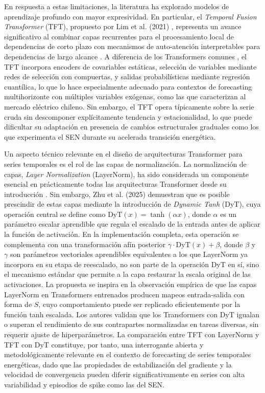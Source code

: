 En respuesta a estas limitaciones, la literatura ha explorado modelos de aprendizaje profundo con mayor expresividad. En particular, el \textit{Temporal Fusion Transformer} (TFT), propuesto por Lim et al. (2021) \cite{TFT}, representa un avance significativo al combinar capas recurrentes para el procesamiento local de dependencias de corto plazo con mecanismos de auto-atención interpretables para dependencias de largo alcance \cite{TFT}. A diferencia de los Transformers comunes \cite{Vaswani2017Attention}, el TFT incorpora encoders de covariables estáticas, selección de variables mediante redes de selección con compuertas, y salidas probabilísticas mediante regresión cuantílica, lo que lo hace especialmente adecuado para contextos de forecasting multihorizonte con múltiples variables exógenas, como las que caracterizan al mercado eléctrico chileno. Sin embargo, el TFT opera típicamente sobre la serie cruda sin descomponer explícitamente tendencia y estacionalidad, lo que puede dificultar su adaptación en presencia de cambios estructurales graduales como los que experimenta el SEN durante su acelerada transición energética.

Un aspecto técnico relevante en el diseño de arquitecturas Transformer para series temporales es el rol de las capas de normalización. La normalización de capas, \textit{Layer Normalization} (LayerNorm), ha sido considerada un componente esencial en prácticamente todas las arquitecturas Transformer desde su introducción \cite{Vaswani2017Attention}. Sin embargo, Zhu et al. (2025) \cite{Zhu2025Transformers} demuestran que es posible prescindir de estas capas mediante la introducción de \textit{Dynamic Tanh} (DyT), cuya operación central se define como $\text{DyT}(x) = \tanh(\alpha x)
$, donde $\alpha$ es un parámetro escalar aprendible que regula el escalado de la entrada antes de aplicar la función de activación. En la implementación completa, esta operación se complementa con una transformación afín posterior $\gamma \cdot \text{DyT}(x) + \beta$, donde $\beta$ y $\gamma$ son parámetros vectoriales aprendibles equivalentes a los que LayerNorm ya incorpora en su etapa de reescalado, no son parte de la operación DyT en sí, sino el mecanismo estándar que permite a la capa restaurar la escala original de las activaciones. La propuesta se inspira en la observación empírica de que las capas LayerNorm en Transformers entrenados producen mapeos entrada-salida con forma de $S$, cuyo comportamiento puede ser replicado eficientemente por la función tanh escalada. Los autores validan que los Transformers con DyT igualan o superan el rendimiento de sus contrapartes normalizadas en tareas diversas, sin requerir ajuste de hiperparámetros. La comparación entre TFT con LayerNorm y TFT con DyT constituye, por tanto, una interrogante abierta y metodológicamente relevante en el contexto de forecasting de series temporales energéticas, dado que las propiedades de estabilización del gradiente y la velocidad de convergencia pueden diferir significativamente en series con alta variabilidad y episodios de spike como las del SEN.

